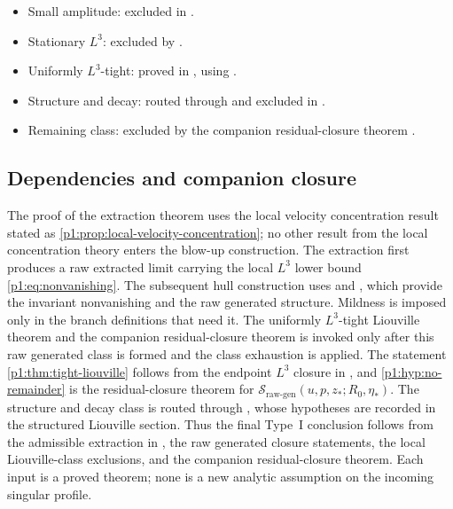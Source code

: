 \documentclass[11pt]{amsart}
\theoremstyle{plain}
\theoremstyle{definition}
\theoremstyle{remark}
\numberwithin{equation}{section}
\newcommand{\calS}{\mathcal S}
\begin{document}
\begin{itemize}[leftmargin=*,itemsep=2pt]
\item Small amplitude: excluded in .
\item Stationary \(L^3\): excluded by \cite{NRS1996}.
\item Uniformly \(L^3\)-tight: proved in , using
.
\item Structure and decay: routed through
 and excluded in
.
\item Remaining class: excluded by the companion residual-closure theorem
.
\end{itemize}

\subsection{Dependencies and companion closure}

The proof of the extraction theorem uses the local velocity concentration
result stated as \cref{p1:prop:local-velocity-concentration}; no other result
from the local concentration theory enters the blow-up construction.  The
extraction first produces a raw extracted limit carrying the local \(L^3\)
lower bound \eqref{p1:eq:nonvanishing}.  The subsequent hull construction uses
 and
, which provide the invariant
nonvanishing and the raw generated structure.  Mildness is imposed only in the
branch definitions that need it.  The uniformly \(L^3\)-tight Liouville theorem and the
companion residual-closure theorem is invoked only after this raw generated class is
formed and the class exhaustion is applied.  The statement
\cref{p1:thm:tight-liouville} follows from the endpoint \(L^3\) closure in
, and \cref{p1:hyp:no-remainder} is the
residual-closure theorem for
\(\calS_{\mathrm{raw\text{-}gen}}(u,p,z_*;R_0,\eta_*)\).  The
structure and decay class is routed through
, whose hypotheses are recorded in the
structured Liouville section.  Thus the final Type~I conclusion follows from
the admissible extraction in , the raw
generated closure statements, the local Liouville-class exclusions, and the
companion residual-closure theorem.  Each input is a proved theorem; none is a
new analytic assumption on the incoming singular profile.
\end{document}
